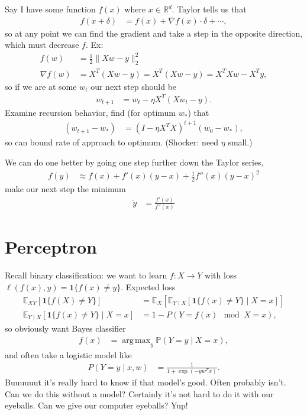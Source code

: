 \documentclass[11pt,letterpaper]{article}
\DeclareMathOperator*{\argmax}{arg\,max}
\theoremstyle{definition}
\theoremstyle{plain}
\numberwithin{equation}{section}
\numberwithin{figure}{section}
\begin{document}
Say I have some function $f(x)$ where $x \in \mathbb{R}^d$. Taylor tells us that
%
\begin{align}
	f(x + \delta) &= f(x) + \nabla f(x) \cdot \delta + \cdots,
\end{align}
%
so at any point we can find the gradient and take a step in the opposite direction, which must decrease $f$. Ex:
%
\begin{align}
	f(w) &= \frac{1}{2} \|X w - y\|_2^2\\
	\nabla f(w) &= X^T(Xw -y) = X^T (Xw -y) = X^T X w - X^T y,
\end{align}
%
so if we are at some $w_t$ our next step should be
%
\begin{align}
	w_{t+1} &= w_t - \eta X^T(X w_t - y).
\end{align}
%
Examine recursion behavior, find (for optimum $w_\ast$) that
%
\begin{align}
	(w_{t+1} - w_\ast) &= \left(I - \eta X^T X \right)^{t+1} (w_0 - w_\ast),
\end{align}
%
so can bound rate of approach to optimum. (Shocker: need $\eta$ small.)


We can do one better by going one step further down the Taylor series,
%
\begin{align}
	f(y) &\approx f(x) + f'(x) (y-x) + \frac{1}{2} f''(x) (y-x)^2
\end{align}
%
make our next step the minimum
%
\begin{align}
	\tilde{y} &= \frac{f'(x)}{f''(x)}
\end{align}










\section{Perceptron}
Recall binary classification: we want to learn $f: X \to Y$ with loss $\ell(f(x),y) = \bm{1}\{f(x)\neq y\}$. Expected loss
%
\begin{align}
	\mathbb{E}_{XY} \left[\bm{1}\{f(X)\neq Y\}\right] &= \mathbb{E}_X\left[\mathbb{E}_{Y\mid X} \left[\bm{1}\{f(x) \neq Y\}\mid X=x\right]\right]\\
	\mathbb{E}_{Y\mid X} \left[\bm{1}\{f(x) \neq Y\}\mid X=x\right] &= 1 - P\left(Y=f(x) \mod X=x\right),
\end{align}
%
so obviously want Bayes classifier
%
\begin{align}
	f(x) &= \argmax_{y} \mathbb{P}\left(Y=y\mid X=x\right),
\end{align}
%
and often take a logistic model like
%
\begin{align}
	P(Y=y\mid x,w) &= \frac{1}{1+ \exp(-yw^T x)}.
\end{align}
%
Buuuuuut it's really hard to know if that model's good. Often probably isn't. Can we do this without a model? Certainly it's not hard to do it with our eyeballs. Can we give our computer eyeballs? Yup!
\end{document}
